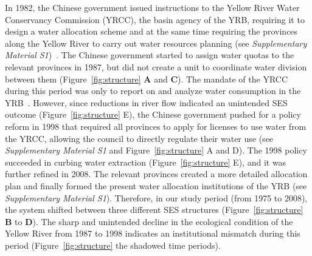 \documentclass{nsr}
\begin{document}
In 1982, the Chinese government issued instructions to the Yellow River Water Conservancy Commission (YRCC), the basin agency of the YRB, requiring it to design a water allocation scheme and at the same time requiring the provinces along the Yellow River to carry out water resources planning (see \textit{Supplementary Material S1})~\cite{wangReviewImplementationYellow2019}.
The Chinese government started to assign water quotas to the relevant provinces in 1987, but did not create a unit to coordinate water division between them (Figure~\ref{fig:structure} \textbf{A} and \textbf{C}).
The mandate of the YRCC during this period was only to report on and analyze water consumption in the YRB~\cite{wangReviewImplementationYellow2019}.
However, since reductions in river flow indicated an unintended SES outcome (Figure~\ref{fig:structure} E), the Chinese government pushed for a policy reform in 1998 that required all provinces to apply for licenses to use water from the YRCC, allowing the council to directly regulate their water use (see \textit{Supplementary Material S1} and Figure~\ref{fig:structure} A and D).
The 1998 policy succeeded in curbing water extraction (Figure~\ref{fig:structure} E), and it was further refined in 2008.
The relevant provinces created a more detailed allocation plan and finally formed the present water allocation institutions of the YRB (see \textit{Supplementary Material S1}).
Therefore, in our study period (from 1975 to 2008), the system shifted between three different SES structures (Figure~\ref{fig:structure} \textbf{B} to \textbf{D}).
The sharp and unintended decline in the ecological condition of the Yellow River from 1987 to 1998 indicates an institutional mismatch during this period (Figure~\ref{fig:structure} the shadowed time periods).
\end{document}

